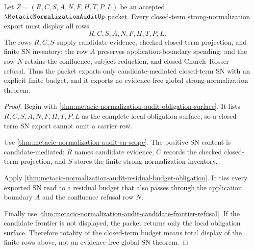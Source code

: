\begin{theorem}
\label{thm:metacic-normalization-audit-closed-term-budget-totality}
Let $Z=(R,C,S,A,N,F,H,T,P,L)$ be an accepted $\MetacicNormalizationAuditUp$ packet. Every closed-term strong-normalization export must display all rows
$$
R,C,S,A,N,F,H,T,P,L.
$$
The rows $R,C,S$ supply candidate evidence, checked closed-term projection, and finite SN inventory; the row $A$ preserves application-boundary spending; and the row $N$ retains the confluence, subject-reduction, and closed Church--Rosser refusal. Thus the packet exports only candidate-mediated closed-term SN with an explicit finite budget, and it exports no evidence-free global strong-normalization theorem.
\end{theorem}
\begin{proof}
Begin with \autoref{thm:metacic-normalization-audit-obligation-surface}. It lists $R,C,S,A,N,F,H,T,P,L$ as the complete local obligation surface, so a closed-term SN export cannot omit a carrier row.

Use \autoref{thm:metacic-normalization-audit-sn-scope}. The positive SN content is candidate-mediated: $R$ names candidate evidence, $C$ records the checked closed-term projection, and $S$ stores the finite strong-normalization inventory.

Apply \autoref{thm:metacic-normalization-audit-residual-budget-obligation}. It ties every exported SN read to a residual budget that also passes through the application boundary $A$ and the confluence refusal row $N$.

Finally use \autoref{thm:metacic-normalization-audit-candidate-frontier-refusal}. If the candidate frontier is not displayed, the packet returns only the local obligation surface. Therefore totality of the closed-term budget means total display of the finite rows above, not an evidence-free global SN theorem.
\end{proof}


